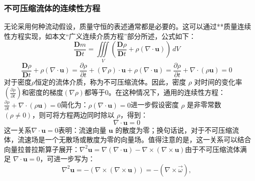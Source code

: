 \subsubsection{不可压缩流体的连续性方程}
无论采用何种流动假设，质量守恒的表述通常都是必要的。这可以通过**质量连续性方程实现，如本文“广义连续介质方程”部分所述，公式如下：
$$
\frac{\mathbf{D} m}{\mathbf{D} t}
= \iiint\limits_V 
\left(
\frac{\mathbf{D} \rho}{\mathbf{D} t}
+ \rho (\nabla \cdot \mathbf{u})
\right)
\, dV~
$$
$$
\frac{\mathbf{D} \rho}{\mathbf{D} t}
+ \rho (\nabla \cdot \mathbf{u})
=
\frac{\partial \rho}{\partial t}
+ (\nabla \rho) \cdot \mathbf{u}
+ \rho (\nabla \cdot \mathbf{u})
=
\frac{\partial \rho}{\partial t}
+ \nabla \cdot (\rho \mathbf{u})
= 0~
$$
对于密度$\rho$恒定的流体介质，称为不可压缩流体。因此，密度 $\rho$ 对时间的变化率$\displaystyle \left(\frac{\partial \rho}{\partial t}\right)$和密度的梯度$\displaystyle (\nabla \rho)$都等于0。在这种情况下，通用的连续性方程：$\frac{\partial \rho}{\partial t} + \nabla \cdot (\rho \mathbf{u}) = 0$简化为：$\rho (\nabla \cdot \mathbf{u}) = 0$进一步假设密度 $\rho$ 是非零常数 $(\rho \neq 0)$，则可将方程两边同时除以 $\rho$，得到：
$$
\nabla \cdot \mathbf{u} = 0~
$$
这一关系$\nabla \cdot \mathbf{u} = 0$表明：流速向量 $\mathbf{u}$ 的散度为零；换句话说，对于不可压缩流体，流速场是一个无散场或散度为零的向量场。值得注意的是，这一关系可以结合向量拉普拉斯算子展开：$\nabla^2 \mathbf{u}= \nabla (\nabla \cdot \mathbf{u})- \nabla \times (\nabla \times \mathbf{u})$由于不可压缩流体满足 $\nabla \cdot \mathbf{u} = 0$，可进一步写为：
$$
\nabla^2 \mathbf{u}
= -(\nabla \times (\nabla \times \mathbf{u}))
= -(\nabla \times \vec{\omega}),~
$$


